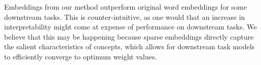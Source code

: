 \documentclass[letterpaper]{article} %
\begin{document}

Embeddings from our method outperform original word embeddings for some downstream tasks. This is counter-intuitive, as one would that an increase in interpretability might come at expense of performance on downstream tasks. We believe that this may be happening because sparse embeddings directly capture the salient characteristics of concepts, which allows for downstream task models to efficiently converge to optimum weight values. %

\end{document}
